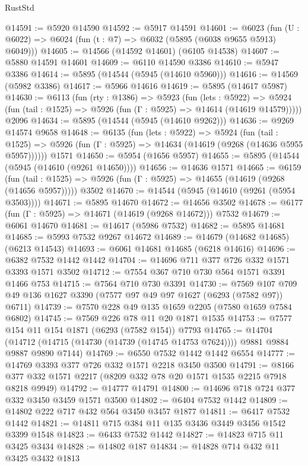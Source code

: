\begin{lexlean}{RustStd}
\begin{coremodule}
{{@14591 := @5920 @14590
@14592 := @5917 @14591
@14601 := @6023 (fun (U : @6022) => @6024 (fun (t : @7) => @6032 (@5895 (@6038 @9655 @5913) @6049)))
@14605 := @14566 (@14592 @14601) (@6105 @14538)
@14607 := @5880 @14591 @14601
@14609 := @6110 @14590 @3386
@14610 := @5947 @3386
@14614 := @5895 (@14544 (@5945 (@14610 @5960)))
@14616 := @14569 (@5982 @3386)
@14617 := @5966 @14616
@14619 := @5895 (@14617 @5987)
@14630 := @6113
    (fun (rty : @1386) =>
    @5923
      (fun (lets : @5922) =>
      @5924 (fun (tail : @1525) => @5926 (fun (Γ : @5925) => @14614 (@14619 @14579)))))
    @2096
@14634 := @5895 (@14544 (@5945 (@14610 @9262)))
@14636 := @9269 @14574 @9658
@14648 := @6135
    (fun (lets : @5922) =>
    @5924
      (fun (tail : @1525) =>
      @5926 (fun (Γ : @5925) => @14634 (@14619 (@9268 (@14636 @5955 @5957))))))
    @1571
@14650 := @5954 (@1656 @5957)
@14655 := @5895 (@14544 (@5945 (@14610 (@9261 @14650))))
@14656 := @14636 @1571
@14665 := @6159
    (fun (tail : @1525) => @5926 (fun (Γ : @5925) => @14655 (@14619 (@9268 (@14656 @5957)))))
    @3502
@14670 := @14544 (@5945 (@14610 (@9261 (@5954 @3503))))
@14671 := @5895 @14670
@14672 := @14656 @3502
@14678 := @6177 (fun (Γ : @5925) => @14671 (@14619 (@9268 @14672))) @7532
@14679 := @6061 @14670
@14681 := @14617 (@5986 @7532)
@14682 := @5895 @14681
@14685 := @5993 @7532 @9267 @14672
@14689 := @14679 (@14682 @14685) (@6213 @14543)
@14693 := @6061 @14681 @14685 (@6218 @14616)
@14696 := @6382 @7532 @1442 @1442
@14704 := @14696 @711 @377 @726 @332 @1571 @3393 @1571 @3502
@14712 := @7554 @367 @710 @730 @564 @1571 @3391 @1466 @753
@14715 := @7564 @710 @730 @3391
@14730 := @7569 @107 @709 @49 @136 @1627 @3390 (@7577 @97 @49 @97 @1627 (@6293 (@7582 @97)) @6711)
@14739 := @7570 @228 @49 @135 @1659 @2205 (@7580 @1659 @7584 @6802)
@14745 := @7569 @226 @78 @11 @20 @1871 @1535
@14753 := @7577 @154 @11 @154 @1871 (@6293 (@7582 @154)) @7793
@14765 := @14704
    (@14712 (@14715 (@14730 (@14739 (@14745 @14753 @7624)))) @9881 @9884 @9887 @9890 @7144)
@14769 := @6550 @7532 @1442 @1442 @6554
@14777 := @14769 @3393 @377 @726 @332 @1571 @2218 @3450 @3500
@14791 := @8166 @377 @332 @1571 @2217 (@8209 @332 @78 @20 @1571 @1535 @2215 @7918 @8218 @9949)
@14792 := @14777 @14791
@14800 := @14696 @718 @724 @377 @332 @3450 @3459 @1571 @3500
@14802 := @6404 @7532 @1442
@14809 := @14802 @222 @717 @432 @564 @3450 @3457 @1877
@14811 := @6417 @7532 @1442
@14821 := @14811 @715 @384 @11 @135 @3436 @3449 @3456 @1542 @3399 @1548
@14823 := @6433 @7532 @1442
@14827 := @14823 @715 @11 @3425 @3434
@14828 := @14802 @187
@14834 := @14828 @714 @432 @11 @3425 @3432 @1813
}}
\end{coremodule}
\end{lexlean}
